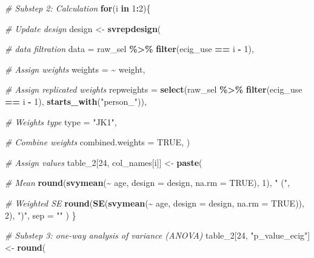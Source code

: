 \documentclass[
]{article}
\newenvironment{Shaded}{\begin{snugshade}}{\end{snugshade}}
\newcommand{\AttributeTok}[1]{\textcolor[rgb]{0.13,0.29,0.53}{#1}}
\newcommand{\CommentTok}[1]{\textcolor[rgb]{0.56,0.35,0.01}{\textit{#1}}}
\newcommand{\ConstantTok}[1]{\textcolor[rgb]{0.56,0.35,0.01}{#1}}
\newcommand{\ControlFlowTok}[1]{\textcolor[rgb]{0.13,0.29,0.53}{\textbf{#1}}}
\newcommand{\DecValTok}[1]{\textcolor[rgb]{0.00,0.00,0.81}{#1}}
\newcommand{\FunctionTok}[1]{\textcolor[rgb]{0.13,0.29,0.53}{\textbf{#1}}}
\newcommand{\NormalTok}[1]{#1}
\newcommand{\OtherTok}[1]{\textcolor[rgb]{0.56,0.35,0.01}{#1}}
\newcommand{\SpecialCharTok}[1]{\textcolor[rgb]{0.81,0.36,0.00}{\textbf{#1}}}
\newcommand{\StringTok}[1]{\textcolor[rgb]{0.31,0.60,0.02}{#1}}
\begin{document}
\begin{Shaded}
\begin{Highlighting}[]
\CommentTok{\# Substep 2: Calculation}
\ControlFlowTok{for}\NormalTok{(i }\ControlFlowTok{in} \DecValTok{1}\SpecialCharTok{:}\DecValTok{2}\NormalTok{)\{}
  
  \CommentTok{\# Update design}
\NormalTok{  design }\OtherTok{\textless{}{-}} \FunctionTok{svrepdesign}\NormalTok{(}
    
    \CommentTok{\# data filtration}
    \AttributeTok{data =}\NormalTok{ raw\_sel }\SpecialCharTok{\%\textgreater{}\%} \FunctionTok{filter}\NormalTok{(ecig\_use }\SpecialCharTok{==}\NormalTok{ i }\SpecialCharTok{{-}} \DecValTok{1}\NormalTok{),}
  
    \CommentTok{\# Assign weights}
    \AttributeTok{weights =} \SpecialCharTok{\textasciitilde{}}\NormalTok{ weight,}
  
    \CommentTok{\# Assign replicated weights}
    \AttributeTok{repweights =} \FunctionTok{select}\NormalTok{(raw\_sel }\SpecialCharTok{\%\textgreater{}\%} \FunctionTok{filter}\NormalTok{(ecig\_use }\SpecialCharTok{==}\NormalTok{ i }\SpecialCharTok{{-}} \DecValTok{1}\NormalTok{), }\FunctionTok{starts\_with}\NormalTok{(}\StringTok{"person\_"}\NormalTok{)),}
  
    \CommentTok{\# Weights type}
    \AttributeTok{type =} \StringTok{"JK1"}\NormalTok{,}
  
    \CommentTok{\# Combine weights}
    \AttributeTok{combined.weights =} \ConstantTok{TRUE}\NormalTok{,}
\NormalTok{  )}

  \CommentTok{\# Assign values}
\NormalTok{  table\_2[}\DecValTok{24}\NormalTok{, col\_names[i]] }\OtherTok{\textless{}{-}} \FunctionTok{paste}\NormalTok{(}
  
    \CommentTok{\# Mean}
    \FunctionTok{round}\NormalTok{(}\FunctionTok{svymean}\NormalTok{(}\SpecialCharTok{\textasciitilde{}}\NormalTok{ age, }\AttributeTok{design =}\NormalTok{ design, }\AttributeTok{na.rm =} \ConstantTok{TRUE}\NormalTok{), }\DecValTok{1}\NormalTok{),}
    \StringTok{" ("}\NormalTok{,}
  
    \CommentTok{\# Weighted SE}
    \FunctionTok{round}\NormalTok{(}\FunctionTok{SE}\NormalTok{(}\FunctionTok{svymean}\NormalTok{(}\SpecialCharTok{\textasciitilde{}}\NormalTok{ age, }\AttributeTok{design =}\NormalTok{ design, }\AttributeTok{na.rm =} \ConstantTok{TRUE}\NormalTok{)), }\DecValTok{2}\NormalTok{),}
    \StringTok{")"}\NormalTok{,}
    \AttributeTok{sep =} \StringTok{""}
\NormalTok{  )}
\NormalTok{\}}


\CommentTok{\# Substep 3: one{-}way analysis of variance (ANOVA)}
\NormalTok{table\_2[}\DecValTok{24}\NormalTok{, }\StringTok{"p\_value\_ecig"}\NormalTok{] }\OtherTok{\textless{}{-}} \FunctionTok{round}\NormalTok{(}
  

\end{Highlighting}
\end{Shaded}
\end{document}
